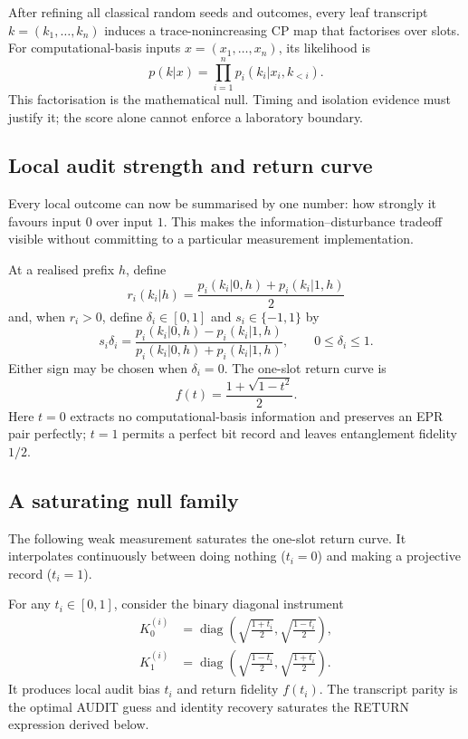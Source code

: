 After refining all classical random seeds and outcomes, every leaf transcript $k=(k_1,\ldots,k_n)$ induces a trace-nonincreasing CP map that factorises over slots. For computational-basis inputs $x=(x_1,\ldots,x_n)$, its likelihood is
\begin{equation}
p(k|x)=\prod_{i=1}^n p_i(k_i|x_i,k_{<i}).
\label{eq:factor}
\end{equation}
This factorisation is the mathematical null. Timing and isolation evidence must justify it; the score alone cannot enforce a laboratory boundary.

\subsection{Local audit strength and return curve}

Every local outcome can now be summarised by one number: how strongly it favours input $0$ over input $1$. This makes the information--disturbance tradeoff visible without committing to a particular measurement implementation.

At a realised prefix $h$, define
\[
r_i(k_i|h)=\frac{p_i(k_i|0,h)+p_i(k_i|1,h)}{2}
\]
and, when $r_i>0$, define $\delta_i\in[0,1]$ and $s_i\in\{-1,1\}$ by
\begin{equation}
s_i\delta_i=
\frac{p_i(k_i|0,h)-p_i(k_i|1,h)}
{p_i(k_i|0,h)+p_i(k_i|1,h)},
\qquad 0\leq\delta_i\leq1.
\label{eq:bias}
\end{equation}
Either sign may be chosen when $\delta_i=0$.
The one-slot return curve is
\begin{equation}
f(t)=\frac{1+\sqrt{1-t^2}}{2}.
\label{eq:fcurve}
\end{equation}
Here $t=0$ extracts no computational-basis information and preserves an EPR pair perfectly; $t=1$ permits a perfect bit record and leaves entanglement fidelity $1/2$.

\subsection{A saturating null family}

The following weak measurement saturates the one-slot return curve. It interpolates continuously between doing nothing ($t_i=0$) and making a projective record ($t_i=1$).

For any $t_i\in[0,1]$, consider the binary diagonal instrument
\begin{align*}
K^{(i)}_0&=\operatorname{diag}\!\left(
\sqrt{\frac{1+t_i}{2}},\sqrt{\frac{1-t_i}{2}}\right),\\
K^{(i)}_1&=\operatorname{diag}\!\left(
\sqrt{\frac{1-t_i}{2}},\sqrt{\frac{1+t_i}{2}}\right).
\end{align*}
It produces local audit bias $t_i$ and return fidelity $f(t_i)$. The transcript parity is the optimal AUDIT guess and identity recovery saturates the RETURN expression derived below.
